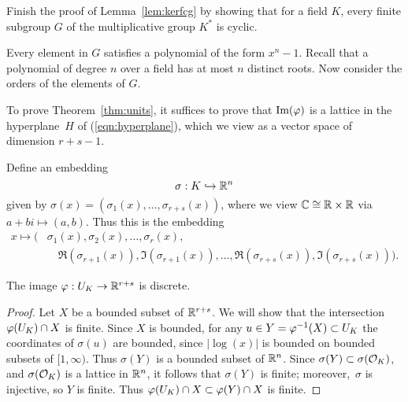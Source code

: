 \begin{exercise}\label{ex:finitesubgroupoffieldcyclic}
	Finish the proof of Lemma~\ref{lem:kerfcg}
	by showing that for a field $K$, every finite
	subgroup $G$ of the multiplicative group $K^*$
	is cyclic.
	
	\begin{hint}
		Every element in $G$ satisfies a polynomial
		of the form $x^n-1$. Recall that a polynomial
		of degree $n$ over a field has at most $n$
		distinct roots. Now consider the orders
		of the elements of $G$.
	\end{hint}
\end{exercise}

To prove Theorem~\ref{thm:units}, it suffices to prove that
$\text{Im}(\varphi)$ is a lattice in the hyperplane~$H$ of
(\ref{eqn:hyperplane}), which we view as a vector space of dimension
$r+s-1$.

Define an embedding
\begin{equation}\label{eqn:sigma3}
	\sigma : K\hookrightarrow \mathbb{R}^n
\end{equation}
given by $\sigma(x) = (\sigma_1(x),\ldots,\sigma_{r+s}(x))$,
where we view $\mathbb{C}\cong \mathbb{R}\times \mathbb{R}$ via $a+b i\mapsto (a,b)$.
Thus this is the embedding
\begin{align*}
	x\mapsto \big(&\sigma_1(x), \sigma_2(x),\ldots, \sigma_r(x), \\
	&\quad \Re(\sigma_{r+1}(x)), \Im(\sigma_{r+1}(x)),
	\ldots, \Re(\sigma_{r+s}(x)), \Im(\sigma_{r+s}(x))\big).
\end{align*}

\begin{lemma}\label{lem:ukdiscrete}
	The image $\varphi:U_K\to \mathbb{R}^{r+s}$ is discrete.
\end{lemma}
\begin{proof}
Let $X$ be a bounded subset of $\mathbb{R}^{r+s}$.
	We will show that the intersection $\varphi(U_K)\cap X$ is finite.
	Since $X$ is bounded, for any $u\in Y=\varphi^{-1}(X)\subset U_K$ the
	coordinates of $\sigma(u)$ are bounded, since $|\log(x)|$ is bounded on
	bounded subsets of $[1,\infty)$. Thus $\sigma(Y)$ is a bounded subset
	of $\mathbb{R}^n$.  Since $\sigma(Y)\subset \sigma(\mathcal{O}_K)$, and $\sigma(\mathcal{O}_K)$ is
	a lattice in $\mathbb{R}^n$, it follows that $\sigma(Y)$ is finite;
	moreover,~$\sigma$ is injective, so $Y$ is finite.
	Thus $\varphi(U_K)\cap X \subset \varphi(Y) \cap X$ is finite.
\end{proof}


